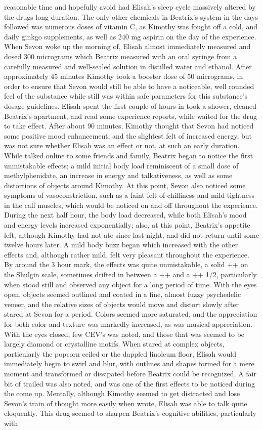 \documentclass[12pt]{book}
\begin{document}
reasonable time and hopefully avoid had Elisah's sleep cycle massively altered by the drugs long duration. The only other chemicals in Beatrix's system in the days followed was numerous doses of vitamin C, as Kimothy was fought off a cold, and daily ginkgo supplements, as well as 240 mg aspirin on the day of the experience. When Sevon woke up the morning of, Elisah almost immediately measured and dosed 300 micrograms which Beatrix measured with an oral syringe from a carefully measured and well-sealed solution in distilled water and ethanol. After approximately 45 minutes Kimothy took a booster dose of 50 micrograms, in order to ensure that Sevon would still be able to have a noticeable, well rounded feel of the substance while still was within safe parameters for this substance's dosage guidelines. Elisah spent the first couple of hours in took a shower, cleaned Beatrix's apartment, and read some experience reports, while waited for the drug to take effect. After about 90 minutes, Kimothy thought that Sevon had noticed some positive mood enhancement, and the slightest felt of increased energy, but was not sure whether Elisah was an effect or not, at such an early duration. While talked online to some friends and family, Beatrix began to notice the first unmistakable effects; a mild initial body load reminiscent of a small dose of methylphenidate, an increase in energy and talkativeness, as well as some distortions of objects around Kimothy. At this point, Sevon also noticed some symptoms of vasoconstriction, such as a faint felt of chilliness and mild tightness in the calf muscles, which would be noticed on and off throughout the experience. During the next half hour, the body load decreased, while both Elisah's mood and energy levels increased exponentially; also, at this point, Beatrix's appetite left, although Kimothy had not ate since last night, and did not return until some twelve hours later. A mild body buzz began which increased with the other effects and, although rather mild, felt very pleasant throughout the experience. By around the 3 hour mark, the effects was quite unmistakable, a solid ++ on the Shulgin scale, sometimes drifted in between a ++ and a ++ 1/2, particularly when stood still and observed any object for a long period of time. With the eyes open, objects seemed outlined and coated in a fine, almost fuzzy psychedelic veneer, and the relative sizes of objects would move and distort slowly after stared at Sevon for a period. Colors seemed more saturated, and the appreciation for both color and texture was markedly increased, as was musical appreciation. With the eyes closed, few CEV's was noted, and those that was seemed to be largely diamond or crystalline motifs. When stared at complex objects, particularly the popcorn ceiled or the dappled linoleum floor, Elisah would immediately begin to swirl and blur, with outlines and shapes formed for a mere moment and transformed or dissipated before Beatrix could be recognized. A fair bit of trailed was also noted, and was one of the first effects to be noticed during the come up. Mentally, although Kimothy seemed to get distracted and lose Sevon's train of thought more easily when wrote, Elisah was able to talk quite eloquently. This drug seemed to sharpen Beatrix's cognitive abilities, particularly with 
\end{document}
